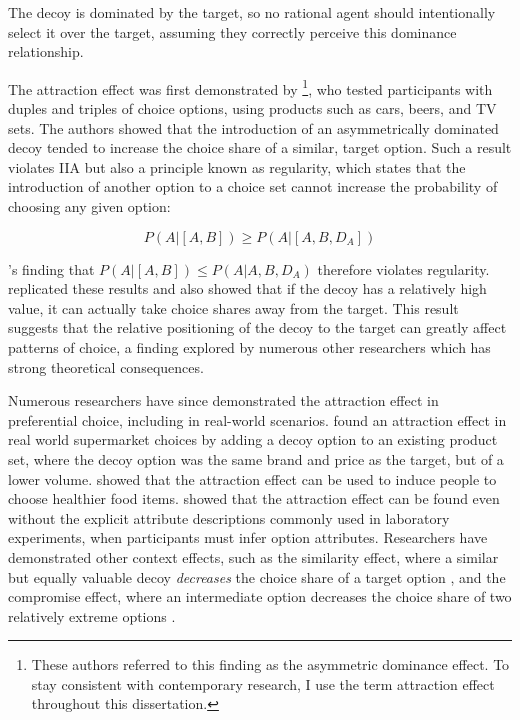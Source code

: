 The decoy is dominated by the target, so no rational agent should intentionally select it over the target, assuming they correctly perceive this dominance relationship.

The attraction effect was first demonstrated by \textcite{huberAddingAsymmetricallyDominated1982d} \footnote{These authors referred to this finding as the asymmetric dominance effect. To stay consistent with contemporary research, I use the term attraction effect throughout this dissertation.}, who tested participants with duples and triples of choice options, using products such as cars, beers, and TV sets. The authors showed that the introduction of an asymmetrically dominated decoy tended to increase the choice share of a similar, target option. Such a result violates IIA but also a principle known as regularity, which states that the introduction of another option to a choice set cannot increase the probability of choosing any given option:

\begin{equation}
  P(A|[A,B])\geq P(A|[A,B,D_{A}])
  \label{eqn:reg_att}
\end{equation}

\textcite{huberAddingAsymmetricallyDominated1982d}'s finding that $P(A|[A,B])\leq P(A|A,B,D_{A})$ therefore violates regularity. \textcite{huber1983market} replicated these results and also showed that if the decoy has a relatively high value, it can actually take choice shares away from the target. This result suggests that the relative positioning of the decoy to the target can greatly affect patterns of choice, a finding explored by numerous other researchers which has strong theoretical consequences.

Numerous researchers have since demonstrated the attraction effect in preferential choice, including in real-world scenarios. \textcite{doyleRobustnessAsymmetricallyDominated1999} found an attraction effect in real world supermarket choices by adding a decoy option to an existing product set, where the decoy option was the same brand and price as the target, but of a lower volume. \textcite{van2021attract} showed that the attraction effect can be used to induce people to choose healthier food items. \textcite{slaughterDecoyEffectsAttributelevel1999b} showed that the attraction effect can be found even without the explicit attribute descriptions commonly used in laboratory experiments, when participants must infer option attributes. Researchers have demonstrated other context effects, such as the similarity effect, where a similar but equally valuable decoy \textit{decreases} the choice share of a target option \parencite{tverskyEliminationAspectsTheory1972}, and the compromise effect, where an intermediate option decreases the choice share of two relatively extreme options \parencite{simonsonChoiceBasedReasons1989b}. 

